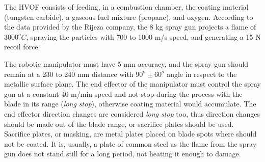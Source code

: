 The HVOF consists of feeding, in a combustion chamber, the coating material
(tungsten carbide), a gaseous fuel mixture (propane), and oxygen. According to
the data provided by the Rijeza company, the 8 kg spray gun projects a flame of
$3000^oC$, spraying the particles with 700 to 1000 m/s speed, and generating a
15 N recoil force.

The robotic manipulator must have 5 mm accuracy, and the spray gun should remain
at a 230 to 240 mm distance with $90^o\pm 60^o$ angle in respect to the metallic
surface plane. The end effector of the manipulator must control the spray
gun at a constant 40 m/min speed and not stop during the process with the blade
in its range (\textit{long stop}), otherwise coating material would
accumulate.
The end effector direction changes are considered \textit{long stop} too, thus
direction changes should be made out of the blade range, or sacrifice plates
should be used. Sacrifice plates, or masking, are metal plates placed on blade
spots where should not be coated. It is, usually, a plate of common steel as the
flame from the spray gun does not stand still for a long period, not heating it
enough to damage. 

